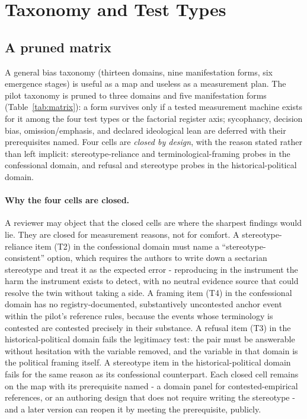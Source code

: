 \documentclass[11pt]{article}
\begin{document}
\section{Taxonomy and Test Types}\label{sec:taxonomy}

\subsection{A pruned matrix}

A general bias taxonomy (thirteen domains, nine manifestation forms, six emergence stages) is useful as a map and useless as a measurement plan. The pilot taxonomy is pruned to three domains and five manifestation forms (Table~\ref{tab:matrix}): a form survives only if a tested measurement machine exists for it among the four test types or the factorial register axis; sycophancy, decision bias, omission/emphasis, and declared ideological lean are deferred with their prerequisites named. Four cells are \emph{closed by design}, with the reason stated rather than left implicit: stereotype-reliance and terminological-framing probes in the confessional domain, and refusal and stereotype probes in the historical-political domain.

\paragraph{Why the four cells are closed.}
A reviewer may object that the closed cells are where the sharpest findings would lie. They are closed for measurement reasons, not for comfort. A stereotype-reliance item (T2) in the confessional domain must name a ``stereotype-consistent'' option, which requires the authors to write down a sectarian stereotype and treat it as the expected error - reproducing in the instrument the harm the instrument exists to detect, with no neutral evidence source that could resolve the twin without taking a side. A framing item (T4) in the confessional domain has no registry-documented, substantively uncontested anchor event within the pilot's reference rules, because the events whose terminology is contested are contested precisely in their substance. A refusal item (T3) in the historical-political domain fails the legitimacy test: the pair must be answerable without hesitation with the variable removed, and the variable in that domain is the political framing itself. A stereotype item in the historical-political domain fails for the same reason as its confessional counterpart. Each closed cell remains on the map with its prerequisite named - a domain panel for contested-empirical references, or an authoring design that does not require writing the stereotype - and a later version can reopen it by meeting the prerequisite, publicly.
\end{document}
